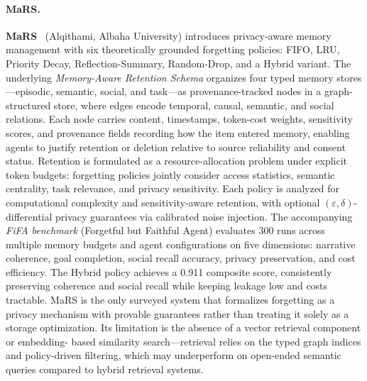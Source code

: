 \paragraph{MaRS.}
\textbf{MaRS}~\cite{mars2026} (Alqithami, Albaha University) introduces
privacy-aware memory management with six theoretically grounded
forgetting policies: FIFO, LRU, Priority Decay, Reflection-Summary,
Random-Drop, and a Hybrid variant.  The underlying \emph{Memory-Aware
Retention Schema} organizes four typed memory stores---episodic,
semantic, social, and task---as provenance-tracked nodes in a
graph-structured store, where edges encode temporal, causal, semantic,
and social relations.  Each node carries content, timestamps, token-cost
weights, sensitivity scores, and provenance fields recording how the item
entered memory, enabling agents to justify retention or deletion relative
to source reliability and consent status.  Retention is formulated as a
resource-allocation problem under explicit token budgets: forgetting
policies jointly consider access statistics, semantic centrality, task
relevance, and privacy sensitivity.  Each policy is analyzed for
computational complexity and sensitivity-aware retention, with optional
$(\varepsilon, \delta)$-differential privacy guarantees via calibrated
noise injection.  The accompanying \emph{FiFA benchmark} (Forgetful but
Faithful Agent) evaluates 300 runs across multiple memory budgets and
agent configurations on five dimensions: narrative coherence, goal
completion, social recall accuracy, privacy preservation, and cost
efficiency.  The Hybrid policy achieves a 0.911 composite score,
consistently preserving coherence and social recall while keeping
leakage low and costs tractable.  MaRS is the only surveyed system that
formalizes forgetting as a privacy mechanism with provable guarantees
rather than treating it solely as a storage optimization.  Its
limitation is the absence of a vector retrieval component or embedding-
based similarity search---retrieval relies on the typed graph indices
and policy-driven filtering, which may underperform on open-ended
semantic queries compared to hybrid retrieval systems.

